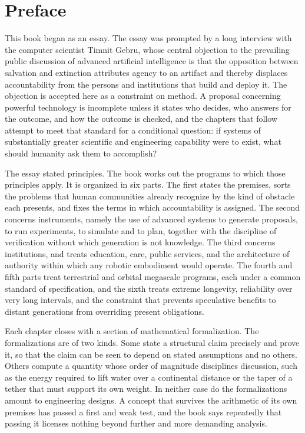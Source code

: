 \chapter*{Preface}

This book began as an essay. The essay was prompted by a long interview with the computer scientist Timnit Gebru, whose central objection to the prevailing public discussion of advanced artificial intelligence is that the opposition between salvation and extinction attributes agency to an artifact and thereby displaces accountability from the persons and institutions that build and deploy it. The objection is accepted here as a constraint on method. A proposal concerning powerful technology is incomplete unless it states who decides, who answers for the outcome, and how the outcome is checked, and the chapters that follow attempt to meet that standard for a conditional question: if systems of substantially greater scientific and engineering capability were to exist, what should humanity ask them to accomplish?

The essay stated principles. The book works out the programs to which those principles apply. It is organized in six parts. The first states the premises, sorts the problems that human communities already recognize by the kind of obstacle each presents, and fixes the terms in which accountability is assigned. The second concerns instruments, namely the use of advanced systems to generate proposals, to run experiments, to simulate and to plan, together with the discipline of verification without which generation is not knowledge. The third concerns institutions, and treats education, care, public services, and the architecture of authority within which any robotic embodiment would operate. The fourth and fifth parts treat terrestrial and orbital megascale programs, each under a common standard of specification, and the sixth treats extreme longevity, reliability over very long intervals, and the constraint that prevents speculative benefits to distant generations from overriding present obligations.

Each chapter closes with a section of mathematical formalization. The formalizations are of two kinds. Some state a structural claim precisely and prove it, so that the claim can be seen to depend on stated assumptions and no others. Others compute a quantity whose order of magnitude disciplines discussion, such as the energy required to lift water over a continental distance or the taper of a tether that must support its own weight. In neither case do the formalizations amount to engineering designs. A concept that survives the arithmetic of its own premises has passed a first and weak test, and the book says repeatedly that passing it licenses nothing beyond further and more demanding analysis.

